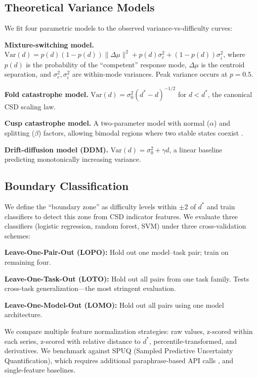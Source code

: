 \documentclass[11pt,letterpaper]{article}
\begin{document}
\subsection{Theoretical Variance Models}

We fit four parametric models to the observed variance-vs-difficulty curves:

\textbf{Mixture-switching model.} $\text{Var}(d) = p(d)(1-p(d))\|\Delta\mu\|^2 + p(d)\sigma_c^2 + (1-p(d))\sigma_i^2$, where $p(d)$ is the probability of the ``competent'' response mode, $\Delta\mu$ is the centroid separation, and $\sigma_c^2, \sigma_i^2$ are within-mode variances. Peak variance occurs at $p = 0.5$.

\textbf{Fold catastrophe model.} $\text{Var}(d) = \sigma_0^2 (d^* - d)^{-1/2}$ for $d < d^*$, the canonical CSD scaling law.

\textbf{Cusp catastrophe model.} A two-parameter model with normal ($\alpha$) and splitting ($\beta$) factors, allowing bimodal regions where two stable states coexist \citep{Gilmore1981, Zeeman1977}.

\textbf{Drift-diffusion model (DDM).} $\text{Var}(d) = \sigma_0^2 + \gamma d$, a linear baseline predicting monotonically increasing variance.

\subsection{Boundary Classification}

We define the ``boundary zone'' as difficulty levels within $\pm 2$ of $d^*$ and train classifiers to detect this zone from CSD indicator features. We evaluate three classifiers (logistic regression, random forest, SVM) under three cross-validation schemes:

\textbf{Leave-One-Pair-Out (LOPO):} Hold out one model--task pair; train on remaining four.

\textbf{Leave-One-Task-Out (LOTO):} Hold out all pairs from one task family. Tests cross-task generalization---the most stringent evaluation.

\textbf{Leave-One-Model-Out (LOMO):} Hold out all pairs using one model architecture.

We compare multiple feature normalization strategies: raw values, z-scored within each series, z-scored with relative distance to $d^*$, percentile-transformed, and derivatives. We benchmark against SPUQ (Sampled Predictive Uncertainty Quantification), which requires additional paraphrase-based API calls \citep{Xiong2023}, and single-feature baselines.
\end{document}
